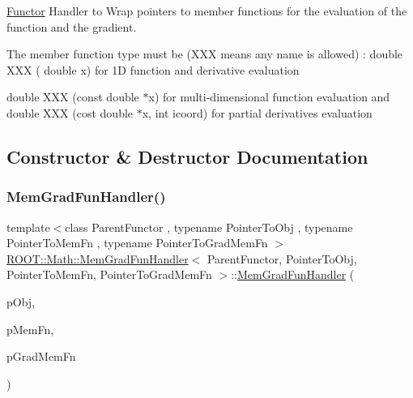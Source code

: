 \mbox{\hyperlink{classROOT_1_1Math_1_1Functor}{Functor}} Handler to Wrap pointers to member functions for the evaluation of the function and the gradient.

The member function type must be (X\+XX means any name is allowed) \+: double X\+XX ( double x) for 1D function and derivative evaluation

double X\+XX (const double $\ast$x) for multi-\/dimensional function evaluation and double X\+XX (cost double $\ast$x, int icoord) for partial derivatives evaluation 

\subsection{Constructor \& Destructor Documentation}
\mbox{\label{classROOT_1_1Math_1_1MemGradFunHandler_afb840379796fb7d05d885bc3152a3175}} 
\subsubsection{\texorpdfstring{MemGradFunHandler()}{MemGradFunHandler()}\hspace{0.1cm}{\footnotesize\ttfamily [1/6]}}
{\footnotesize\ttfamily template$<$class Parent\+Functor , typename Pointer\+To\+Obj , typename Pointer\+To\+Mem\+Fn , typename Pointer\+To\+Grad\+Mem\+Fn $>$ \\
\mbox{\hyperlink{classROOT_1_1Math_1_1MemGradFunHandler}{R\+O\+O\+T\+::\+Math\+::\+Mem\+Grad\+Fun\+Handler}}$<$ Parent\+Functor, Pointer\+To\+Obj, Pointer\+To\+Mem\+Fn, Pointer\+To\+Grad\+Mem\+Fn $>$\+::\mbox{\hyperlink{classROOT_1_1Math_1_1MemGradFunHandler}{Mem\+Grad\+Fun\+Handler}} (\begin{DoxyParamCaption}\item[{const Pointer\+To\+Obj \&}]{p\+Obj,  }\item[{Pointer\+To\+Mem\+Fn}]{p\+Mem\+Fn,  }\item[{Pointer\+To\+Grad\+Mem\+Fn}]{p\+Grad\+Mem\+Fn }\end{DoxyParamCaption})\hspace{0.3cm}{\ttfamily [inline]}}



